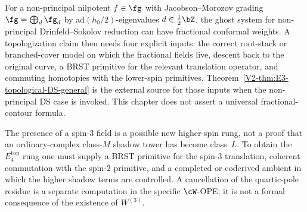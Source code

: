 \begin{remark}
\label{rem:fractional-ghost-nonprincipal}
%
%
For a non-principal nilpotent $f \in \fg$ with
Jacobson--Morozov grading $\fg = \bigoplus_d \fg_d$ by
$\mathrm{ad}(h_0/2)$-eigenvalues $d \in \tfrac12\bZ$, the
ghost system for non-principal Drinfeld--Sokolov reduction
can have fractional conformal weights. A topologization claim
then needs four explicit inputs: the correct root-stack or
branched-cover model on which the fractional fields live,
descent back to the original curve, a BRST primitive for the
relevant translation operator, and commuting homotopies with
the lower-spin primitives. Theorem~\ref{V2-thm:E3-topological-DS-general}
is the external source for those inputs when the non-principal
DS case is invoked. This chapter does not assert a universal
fractional-contour formula.
\end{remark}

\begin{remark}
\label{rem:class-M-to-L-via-spin-3}
%
%
The presence of a spin-$3$ field is a possible new
higher-spin rung, not a proof that an ordinary-complex
class-$M$ shadow tower has become class~$L$. To obtain the
$E_4^{\mathrm{top}}$ rung one must supply a BRST primitive
for the spin-$3$ translation, coherent commutation with the
spin-$2$ primitive, and a completed or coderived ambient in
which the higher shadow terms are controlled. A cancellation
of the quartic-pole residue is a separate computation in the
specific $\cW$-OPE; it is not a formal consequence of the
existence of $W^{(3)}$.
\end{remark}


